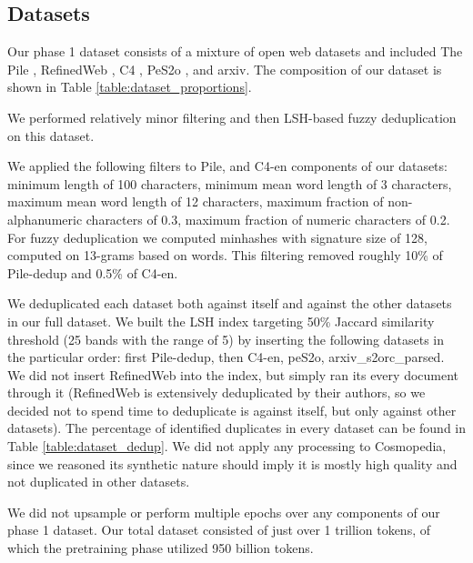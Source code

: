 \subsection{Datasets}

Our phase 1 dataset consists of a mixture of open web datasets and included The Pile \citep{gao2020pile}, RefinedWeb \citep{penedo2023refinedweb}, C4 \citep{raffel2020exploring}, PeS2o \citep{peS2o}, and arxiv. The composition of our dataset is shown in Table \ref{table:dataset_proportions}.

We performed relatively minor filtering and then LSH-based fuzzy deduplication on this dataset. 

We applied the following filters to Pile, and C4-en components of our datasets: minimum length of 100 characters, minimum mean word length of 3 characters, maximum mean word length of 12 characters, maximum fraction of non-alphanumeric characters of 0.3, maximum fraction of numeric characters of 0.2. For fuzzy deduplication we computed minhashes with signature size of 128, computed on 13-grams based on words. This filtering removed roughly 10\% of Pile-dedup and 0.5\% of C4-en. 

We deduplicated each dataset both against itself and against the other datasets in our full dataset. We built the LSH index targeting 50\% Jaccard similarity threshold (25 bands with the range of 5) by inserting the following datasets in the particular order: first Pile-dedup, then C4-en, peS2o, arxiv\_s2orc\_parsed. 
We did not insert RefinedWeb into the index, but simply ran its every document through it (RefinedWeb is extensively deduplicated by their authors, so we decided not to spend time to deduplicate is against itself, but only against other datasets). The percentage of identified duplicates in every dataset can be found in Table \ref{table:dataset_dedup}. We did not apply any processing to Cosmopedia, since we reasoned its synthetic nature should imply it is mostly high quality and not duplicated in other datasets.

We did not upsample or perform multiple epochs over any components of our phase 1 dataset. Our total dataset consisted of just over 1 trillion tokens, of which the pretraining phase utilized 950 billion tokens.

